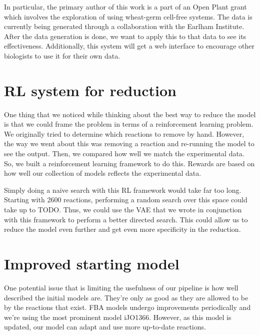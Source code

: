 In particular, the primary author of this work is a part of an Open Plant grant which involves the exploration of using wheat-germ cell-free systems.
The data is currently being generated through a collaboration with the Earlham Institute.
After the data generation is done, we want to apply this to that data to see its effectiveness.
Additionally, this system will get a web interface to encourage other biologists to use it for their own data.

\section{RL system for reduction}
One thing that we noticed while thinking about the best way to reduce the model is that we could frame the problem in terms of a reinforcement learning problem.
We originally tried to determine which reactions to remove by hand.
However, the way we went about this was removing a reaction and re-running the model to see the output.
Then, we compared how well we match the experimental data.
So, we built a reinforcement learning framework to do this.
Rewards are based on how well our collection of models reflects the experimental data.

Simply doing a naive search with this RL framework would take far too long.
Starting with 2600 reactions, performing a random search over this space could take up to TODO.
Thus, we could use the VAE that we wrote in conjunction with this framework to perform a better directed search.
This could allow us to reduce the model even further and get even more specificity in the reduction.

\section{Improved starting model}
One potential issue that is limiting the usefulness of our pipeline is how well described the initial models are.
They're only as good as they are allowed to be by the reactions that exist.
FBA models undergo improvements periodically and we're using the most prominent model iJO1366.
However, as this model is updated, our model can adapt and use more up-to-date reactions.

